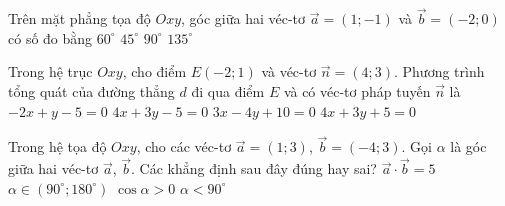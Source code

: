 

\begin{ex}%
	Trên mặt phẳng tọa độ $Oxy$, góc giữa hai véc-tơ  $\overrightarrow{a}=(1;-1)$ và $\overrightarrow{b}=(-2;0)$ có số đo bằng
	 \choice
		{$60^{\circ}$} 
		 {$45^{\circ}$}
		{$90^{\circ}$} 
		{\True $135^{\circ}$} 
\end{ex}

\begin{ex}%
	Trong hệ trục $Oxy$, cho điểm $E(-2;1)$ và véc-tơ $\overrightarrow{n}=(4;3)$. Phương trình tổng quát của đường thẳng $d$ đi qua điểm $E$ và  có véc-tơ pháp tuyến $\overrightarrow{n}$ là
	\choice 
		 {$-2x+y-5=0$}
		{$4x+3y-5=0$} 
		 {$3x-4y+10=0$}
		{\True $4x+3y+5=0$} 
\end{ex}


\begin{ex}%
	Trong hệ tọa độ $Oxy$, cho các véc-tơ $\overrightarrow{a}=(1;3)$, $\overrightarrow{b}=(-4;3)$. Gọi $\alpha$ là góc giữa hai véc-tơ $\overrightarrow{a}$, $\overrightarrow{b}$. Các  khẳng định sau đây đúng hay sai?
	 \choiceTF
		{\True $\overrightarrow{a}\cdot\overrightarrow{b}=5$} 
		{$\alpha\in  (90^\circ; 180^\circ)$}
		 {\True $\cos\alpha>0$}
		 {\True $\alpha<90^\circ$}
\end{ex}

